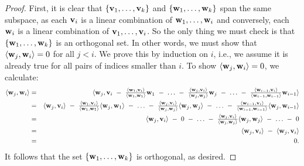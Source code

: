\begin{proof}
  First, it is clear that $\set{\vect{v}_1,\ldots,\vect{v}_k}$ and
  $\set{\vect{w}_1,\ldots,\vect{w}_k}$ span the same subspace, as each
  $\vect{v}_i$ is a linear combination of
  $\vect{w}_1,\ldots,\vect{w}_i$ and conversely, each $\vect{w}_i$ is
  a linear combination of $\vect{v}_1,\ldots,\vect{v}_i$. So the only
  thing we must check is that $\set{\vect{w}_1,\ldots,\vect{w}_k}$ is
  an orthogonal set. In other words, we must show that
  $\iprod{\vect{w}_j,\vect{w}_i}=0$ for all $j<i$. We prove this by
  induction on $i$, i.e., we assume it is already true for all pairs
  of indices smaller than $i$. To show
  $\iprod{\vect{w}_j,\vect{w}_i}=0$, we calculate:
  \begin{eqnarray*}
    \iprod{\vect{w}_j,\vect{w}_i}
    &=& \textstyle
        \iprod{\vect{w}_j, \vect{v}_i
        ~-~ \frac{\iprod{\vect{w}_1,\vect{v}_i}}{\iprod{\vect{w}_1,\vect{w}_1}}\vect{w}_1
        ~-~ \ldots
        ~-~ \frac{\iprod{\vect{w}_j,\vect{v}_i}}{\iprod{\vect{w}_j,\vect{w}_j}}\vect{w}_j
        ~-~ \ldots
        ~-~ \frac{\iprod{\vect{w}_{i-1},\vect{v}_i}}{\iprod{\vect{w}_{i-1},\vect{w}_{i-1}}}\vect{w}_{i-1}}
    \\
    &=& \textstyle
        \iprod{\vect{w}_j, \vect{v}_i}
        ~-~ \frac{\iprod{\vect{w}_1,\vect{v}_i}}{\iprod{\vect{w}_1,\vect{w}_1}}\iprod{\vect{w}_j,\vect{w}_1}
        ~-~ \ldots
        ~-~ \frac{\iprod{\vect{w}_j,\vect{v}_i}}{\iprod{\vect{w}_j,\vect{w}_j}}\iprod{\vect{w}_j,\vect{w}_j}
        ~-~ \ldots
        ~-~ \frac{\iprod{\vect{w}_{i-1},\vect{v}_i}}{\iprod{\vect{w}_{i-1},\vect{w}_{i-1}}}\iprod{\vect{w}_j,\vect{w}_{i-1}}
    \\
    &=& \textstyle
        \iprod{\vect{w}_j, \vect{v}_i}
        ~-~ 0
        ~-~ \ldots
        ~-~ \frac{\iprod{\vect{w}_j,\vect{v}_i}}{\iprod{\vect{w}_j,\vect{w}_j}}\iprod{\vect{w}_j,\vect{w}_j}
        ~-~ \ldots
        ~-~ 0
    \\
    &=& \iprod{\vect{w}_j, \vect{v}_i}
        ~-~ \iprod{\vect{w}_j,\vect{v}_i}
    \\
    &=& 0.
  \end{eqnarray*}
  It follows that the set $\set{\vect{w}_1,\ldots,\vect{w}_k}$ is
  orthogonal, as desired.
\end{proof}

